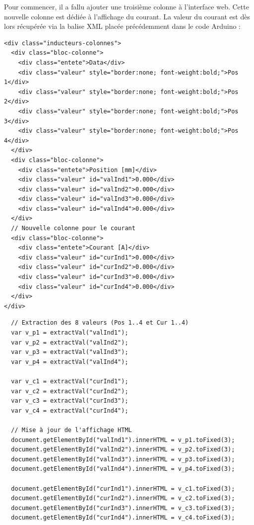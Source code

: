 Pour commencer, il a fallu ajouter une troisième colonne à l'interface web. Cette nouvelle colonne est dédiée à l'affichage du courant. La valeur du courant est dès lors récupérée via la balise XML placée précédemment dans le code Arduino :

\begin{verbatim}
<div class="inducteurs-colonnes">
  <div class="bloc-colonne">
    <div class="entete">Data</div>
    <div class="valeur" style="border:none; font-weight:bold;">Pos 1</div>
    <div class="valeur" style="border:none; font-weight:bold;">Pos 2</div>
    <div class="valeur" style="border:none; font-weight:bold;">Pos 3</div>
    <div class="valeur" style="border:none; font-weight:bold;">Pos 4</div>
  </div>
  <div class="bloc-colonne">
    <div class="entete">Position [mm]</div>
    <div class="valeur" id="valInd1">0.000</div>
    <div class="valeur" id="valInd2">0.000</div>
    <div class="valeur" id="valInd3">0.000</div>
    <div class="valeur" id="valInd4">0.000</div>
  </div>
  // Nouvelle colonne pour le courant
  <div class="bloc-colonne">
    <div class="entete">Courant [A]</div>
    <div class="valeur" id="curInd1">0.000</div>
    <div class="valeur" id="curInd2">0.000</div>
    <div class="valeur" id="curInd3">0.000</div>
    <div class="valeur" id="curInd4">0.000</div>
  </div>
</div>
\end{verbatim}

\begin{verbatim}
  // Extraction des 8 valeurs (Pos 1..4 et Cur 1..4)
  var v_p1 = extractVal("valInd1");
  var v_p2 = extractVal("valInd2");
  var v_p3 = extractVal("valInd3");
  var v_p4 = extractVal("valInd4");

  var v_c1 = extractVal("curInd1");
  var v_c2 = extractVal("curInd2");
  var v_c3 = extractVal("curInd3");
  var v_c4 = extractVal("curInd4");

  // Mise à jour de l'affichage HTML
  document.getElementById("valInd1").innerHTML = v_p1.toFixed(3);
  document.getElementById("valInd2").innerHTML = v_p2.toFixed(3);
  document.getElementById("valInd3").innerHTML = v_p3.toFixed(3);
  document.getElementById("valInd4").innerHTML = v_p4.toFixed(3);

  document.getElementById("curInd1").innerHTML = v_c1.toFixed(3);
  document.getElementById("curInd2").innerHTML = v_c2.toFixed(3);
  document.getElementById("curInd3").innerHTML = v_c3.toFixed(3);
  document.getElementById("curInd4").innerHTML = v_c4.toFixed(3);
\end{verbatim}

